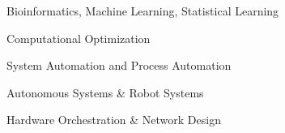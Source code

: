 \item {}\label{research:bioinformatics}Bioinformatics, Machine Learning, Statistical Learning
\item {}\label{research:optimization}Computational Optimization
\item {}\label{research:automation}System Automation and Process Automation
\item {}\label{research:autonomous}Autonomous Systems \& Robot Systems
\item {}\label{research:hardware}Hardware Orchestration \& Network Design
